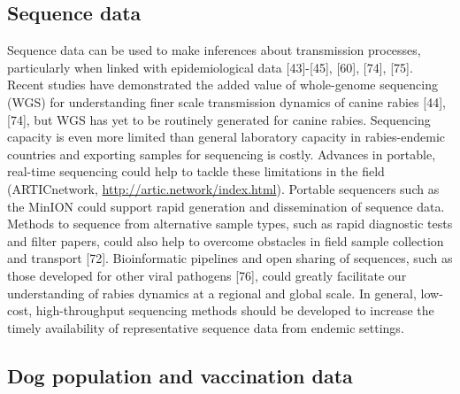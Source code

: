 \documentclass[
  oneside]{book}
\begin{document}
\hypertarget{sequence-data}{%
\subsection{Sequence data}\label{sequence-data}}

Sequence data can be used to make inferences about transmission
processes, particularly when linked with epidemiological data
{[}43{]}-{[}45{]}, {[}60{]}, {[}74{]}, {[}75{]}. Recent studies have demonstrated
the added value of whole-genome sequencing (WGS) for understanding finer
scale transmission dynamics of canine rabies {[}44{]}, {[}74{]}, but WGS has
yet to be routinely generated for canine rabies. Sequencing capacity is
even more limited than general laboratory capacity in rabies-endemic
countries and exporting samples for sequencing is costly. Advances in
portable, real-time sequencing could help to tackle these limitations in
the field (ARTICnetwork, \url{http://artic.network/index.html}). Portable
sequencers such as the MinION could support rapid generation and
dissemination of sequence data. Methods to sequence from alternative
sample types, such as rapid diagnostic tests and filter papers, could
also help to overcome obstacles in field sample collection and transport
{[}72{]}. Bioinformatic pipelines and open sharing of sequences, such as
those developed for other viral pathogens {[}76{]}, could greatly
facilitate our understanding of rabies dynamics at a regional and global
scale. In general, low-cost, high-throughput sequencing methods should
be developed to increase the timely availability of representative
sequence data from endemic settings.

\hypertarget{dog-population-and-vaccination-data}{%
\subsection{Dog population and vaccination data}\label{dog-population-and-vaccination-data}}
\end{document}
